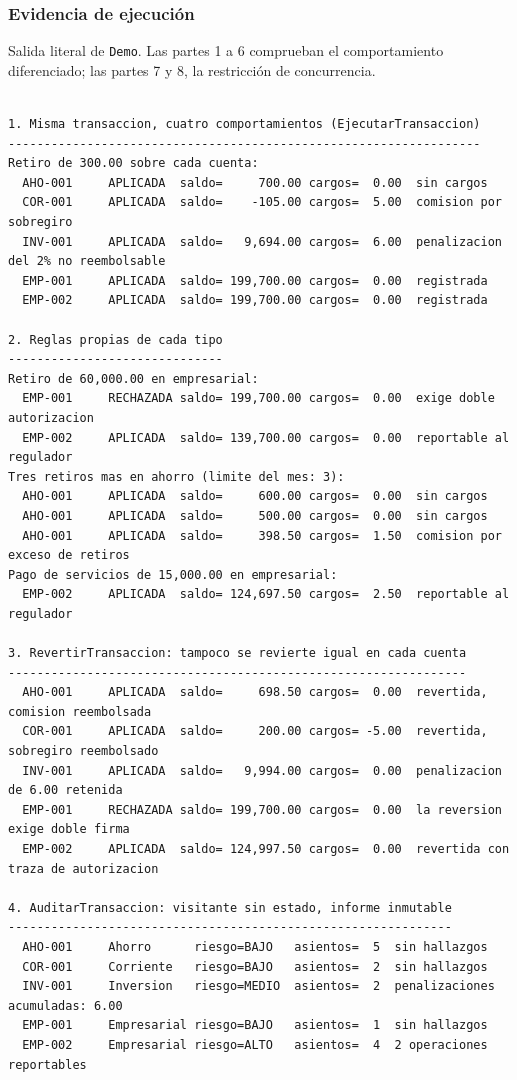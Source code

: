\subsubsection*{Evidencia de ejecución}

Salida literal de \texttt{Demo}. Las partes 1 a 6 comprueban el comportamiento diferenciado;
las partes 7 y 8, la restricción de concurrencia.

{\footnotesize
\begin{verbatim}

1. Misma transaccion, cuatro comportamientos (EjecutarTransaccion)
------------------------------------------------------------------
Retiro de 300.00 sobre cada cuenta:
  AHO-001     APLICADA  saldo=     700.00 cargos=  0.00  sin cargos
  COR-001     APLICADA  saldo=    -105.00 cargos=  5.00  comision por sobregiro
  INV-001     APLICADA  saldo=   9,694.00 cargos=  6.00  penalizacion del 2% no reembolsable
  EMP-001     APLICADA  saldo= 199,700.00 cargos=  0.00  registrada
  EMP-002     APLICADA  saldo= 199,700.00 cargos=  0.00  registrada

2. Reglas propias de cada tipo
------------------------------
Retiro de 60,000.00 en empresarial:
  EMP-001     RECHAZADA saldo= 199,700.00 cargos=  0.00  exige doble autorizacion
  EMP-002     APLICADA  saldo= 139,700.00 cargos=  0.00  reportable al regulador
Tres retiros mas en ahorro (limite del mes: 3):
  AHO-001     APLICADA  saldo=     600.00 cargos=  0.00  sin cargos
  AHO-001     APLICADA  saldo=     500.00 cargos=  0.00  sin cargos
  AHO-001     APLICADA  saldo=     398.50 cargos=  1.50  comision por exceso de retiros
Pago de servicios de 15,000.00 en empresarial:
  EMP-002     APLICADA  saldo= 124,697.50 cargos=  2.50  reportable al regulador

3. RevertirTransaccion: tampoco se revierte igual en cada cuenta
----------------------------------------------------------------
  AHO-001     APLICADA  saldo=     698.50 cargos=  0.00  revertida, comision reembolsada
  COR-001     APLICADA  saldo=     200.00 cargos= -5.00  revertida, sobregiro reembolsado
  INV-001     APLICADA  saldo=   9,994.00 cargos=  0.00  penalizacion de 6.00 retenida
  EMP-001     RECHAZADA saldo= 199,700.00 cargos=  0.00  la reversion exige doble firma
  EMP-002     APLICADA  saldo= 124,997.50 cargos=  0.00  revertida con traza de autorizacion

4. AuditarTransaccion: visitante sin estado, informe inmutable
--------------------------------------------------------------
  AHO-001     Ahorro      riesgo=BAJO   asientos=  5  sin hallazgos
  COR-001     Corriente   riesgo=BAJO   asientos=  2  sin hallazgos
  INV-001     Inversion   riesgo=MEDIO  asientos=  2  penalizaciones acumuladas: 6.00
  EMP-001     Empresarial riesgo=BAJO   asientos=  1  sin hallazgos
  EMP-002     Empresarial riesgo=ALTO   asientos=  4  2 operaciones reportables


\end{verbatim}}
